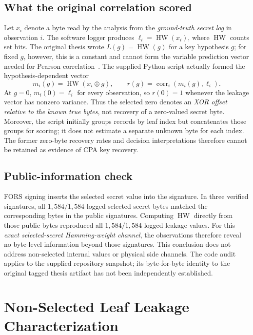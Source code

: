 \documentclass[conference,a4paper,10pt]{IEEEtran}
\begin{document}
\subsection{What the original correlation scored}
Let $x_i$ denote a byte read by the analysis from the \emph{ground-truth secret log} in observation $i$. The software logger produces $\ell_i=\operatorname{HW}(x_i)$, where $\operatorname{HW}$ counts set bits. The original thesis wrote $L(g)=\operatorname{HW}(g)$ for a key hypothesis $g$; for fixed $g$, however, this is a constant and cannot form the variable prediction vector needed for Pearson correlation~\cite{brier}. The supplied Python script actually formed the hypothesis-dependent vector
\begin{equation}
 m_i(g)=\operatorname{HW}(x_i\oplus g),\qquad
 r(g)=\operatorname{corr}_i(m_i(g),\ell_i).
 \label{eq:oldscore}
\end{equation}
At $g=0$, $m_i(0)=\ell_i$ for every observation, so $r(0)=1$ whenever the leakage vector has nonzero variance. Thus the selected zero denotes an \emph{XOR offset relative to the known true bytes}, not recovery of a zero-valued secret byte. Moreover, the script initially groups records by leaf index but concatenates those groups for scoring; it does not estimate a separate unknown byte for each index. The former zero-byte recovery rates and decision interpretations therefore cannot be retained as evidence of CPA key recovery.

\subsection{Public-information check}
FORS signing inserts the selected secret value into the signature. In three verified signatures, all $1{,}584/1{,}584$ logged selected-secret bytes matched the corresponding bytes in the public signatures. Computing $\operatorname{HW}$ directly from those public bytes reproduced all $1{,}584/1{,}584$ logged leakage values. For this \emph{exact selected-secret Hamming-weight channel}, the observations therefore reveal no byte-level information beyond those signatures. This conclusion does not address non-selected internal values or physical side channels. The code audit applies to the supplied repository snapshot; its byte-for-byte identity to the original tagged thesis artifact has not been independently established.

\section{Non-Selected Leaf Leakage Characterization}
\end{document}
